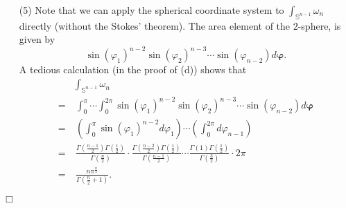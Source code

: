 \documentclass{article}
\begin{document}
\begin{enumerate}
\item[(5)]
  Note that we can apply the spherical coordinate system
  to $\int_{\mathbb{S}^{n-1}} \omega_n$ directly (without the Stokes' theorem).
  The area element of the $2$-sphere, is given by
  \[
    \sin(\varphi_1)^{n-2} \sin(\varphi_2)^{n-3} \cdots \sin(\varphi_{n-2})
    d\bm{\varphi}.
  \]
  A tedious calculation (in the proof of (d)) shows that
  \begin{align*}
    &\int_{\mathbb{S}^{n-1}} \omega_n \\
    =& \: \int_{0}^{\pi} \cdots \int_{0}^{2\pi}
      \sin(\varphi_1)^{n-2} \sin(\varphi_2)^{n-3} \cdots \sin(\varphi_{n-2})
      d\bm{\varphi} \\
    =& \: \left(\int_{0}^{\pi} \sin(\varphi_1)^{n-2} d\varphi_1 \right)
      \cdots
      \left(\int_{0}^{2\pi} d\varphi_{n-1} \right) \\
    =& \: \frac{\Gamma(\frac{n-1}{2})\Gamma(\frac{1}{2})}{\Gamma(\frac{n}{2})}
      \cdot \frac{\Gamma(\frac{n-2}{2})\Gamma(\frac{1}{2})}{\Gamma(\frac{n-1}{2})}
      \cdots
      \frac{\Gamma(1)\Gamma(\frac{1}{2})}{\Gamma(\frac{3}{2})} \cdot 2\pi \\
    =& \: \frac{n\pi^{\frac{n}{2}}}{\Gamma\left(\frac{n}{2}+1\right)}.
  \end{align*}
\end{enumerate}
$\Box$ \\
\end{document}
